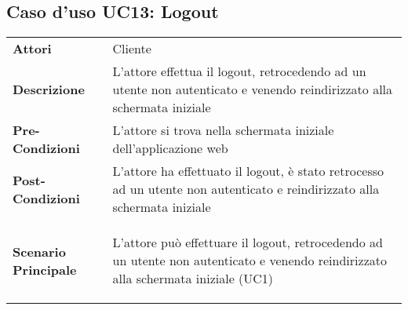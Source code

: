 \newpage
\subsection{Caso d'uso UC13: Logout}
\label{UC13}

\begin{longtable}{ l | p{11cm}}
	\hline
	\rowcolor{Gray}
	\multicolumn{2}{c}{UC13 - Logout} \\
	\hline
	\textbf{Attori} & Cliente \\
	\textbf{Descrizione} & L'attore effettua il logout, retrocedendo ad un utente non autenticato e venendo reindirizzato alla schermata iniziale \\
	\textbf{Pre-Condizioni} & L'attore si trova nella schermata iniziale dell'applicazione web \\
	\textbf{Post-Condizioni}& L'attore ha effettuato il logout, è stato retrocesso ad un utente non autenticato e reindirizzato alla schermata iniziale \\
	\textbf{Scenario Principale} & 
	\begin{enumerate*}[label=(\arabic*.),itemjoin={\newline}]
		\item L'attore può effettuare il logout, retrocedendo ad un utente non autenticato e venendo reindirizzato alla schermata iniziale (UC1)
	\end{enumerate*}\\
\end{longtable}